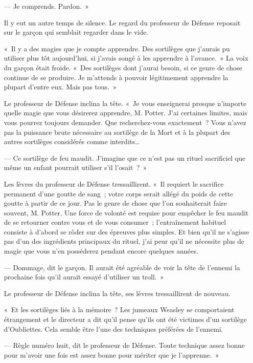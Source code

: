 --- Je comprends. Pardon.~»

Il y eut un autre temps de silence. Le regard du professeur de Défense reposait sur le garçon qui semblait regarder dans le vide.

«~Il y a des magies que je compte apprendre. Des sortilèges que j'aurais pu utiliser plus tôt aujourd'hui, si j'avais songé à les apprendre à l'avance.~» La voix du garçon était froide. «~Des sortilèges dont j'aurai besoin, si ce genre de chose continue de se produire. Je m'attends à pouvoir légitimement apprendre la plupart d'entre eux. Mais pas tous.~»

Le professeur de Défense inclina la tête. «~Je vous enseignerai presque n'importe quelle magie que vous désirerez apprendre, M. Potter. J'ai certaines limites, mais vous pourrez toujours demander. Que recherchez-vous exactement~? Vous n'avez pas la puissance brute nécessaire au sortilège de la Mort et à la plupart des autres sortilèges considérés comme interdits…

--- Ce sortilège de feu maudit. J'imagine que ce n'est pas un rituel sacrificiel que même un enfant pourrait utiliser s'il l'osait~?~»

Les lèvres du professeur de Défense tressaillirent. «~Il requiert le sacrifice permanent d'une goutte de sang~; votre corps serait allégé du poids de cette goutte à partir de ce jour. Pas le genre de chose que l'on souhaiterait faire souvent, M. Potter. Une force de volonté est requise pour empêcher le feu maudit de se retourner contre vous et de vous consumer~; l'entraînement habituel consiste à d'abord se rôder sur des épreuves plus simples. Et bien qu'il ne s'agisse pas d'un des ingrédients principaux du rituel, j'ai peur qu'il ne nécessite plus de magie que vous n'en posséderez pendant encore quelques années.

--- Dommage, dit le garçon. Il aurait été agréable de voir la tête de l'ennemi la prochaine fois qu'il aurait essayé d'utiliser un troll.~»

Le professeur de Défense inclina la tête, ses lèvres tressaillirent de nouveau.

«~Et les sortilèges liés à la mémoire~? Les jumeaux Weasley se comportaient étrangement et le directeur a dit qu'il pense qu'ils ont été victimes d'un sortilège d'Oubliettes. Cela semble être l'une des techniques préférées de l'ennemi.

--- Règle numéro huit, dit le professeur de Défense. Toute technique assez bonne pour m'avoir une fois est assez bonne pour mériter que je l'apprenne.~»

